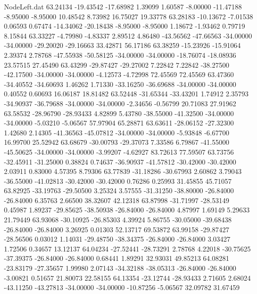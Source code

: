 \begin{filecontents}{NodeLeft.dat}
  63.24134  -19.43542  -17.68982     1.39099    1.60587   -8.00000  -11.47188   -8.95000   -8.95000   10.48542    8.73982   16.75027   19.33778
  63.28183  -10.13672   -7.01538     0.06593    0.67474  -14.34062  -20.18438   -8.95000   -8.95000    1.18672   -1.93462    0.79719    8.15844
  63.33227   -4.79980   -4.83337     2.89512    4.86480  -43.56562  -47.66563  -34.00000  -34.00000  -29.20020  -29.16663   33.42871   56.17186
  63.38259  -15.23926  -15.91064     2.39374    2.78768  -47.55938  -50.58125  -34.00000  -34.00000  -18.76074  -18.08936   23.57515   27.45490
  63.43299  -29.87427  -29.27002     7.22842    7.22842  -38.27500  -42.17500  -34.00000  -34.00000   -4.12573   -4.72998   72.45569   72.45569
  63.47360  -34.40552  -34.60693     1.46262    1.71330  -33.16250  -36.69688  -34.00000  -34.00000    0.40552    0.60693   16.06187   18.81482
  63.52448  -31.65344  -33.43201     1.74912    2.35793  -34.90937  -36.79688  -34.00000  -34.00000   -2.34656   -0.56799   20.71083   27.91962
  63.58532  -28.96790  -28.93433     4.82899    5.43780  -38.55000  -41.32500  -34.00000  -34.00000   -5.03210   -5.06567   57.97904   65.28871
  63.63611  -28.06152  -27.32300     1.42680    2.14305  -41.36563  -45.07812  -34.00000  -34.00000   -5.93848   -6.67700   16.99700   25.52942
  63.68679  -30.00793  -29.37073     7.33586    6.79867  -41.55000  -45.50625  -34.00000  -34.00000   -3.99207   -4.62927   83.72613   77.59507
  63.73756  -32.45911  -31.25000     0.38824    0.74637  -36.90937  -41.57812  -30.42000  -30.42000    2.03911    0.83000    4.57395    8.79306
  63.77839  -31.18286  -30.67993     2.60862    3.79043  -36.55000  -41.02813  -30.42000  -30.42000    0.76286    0.25993   31.45855   45.71057
  63.82925  -33.19763  -29.50500     3.25324    3.57555  -31.31250  -38.80000  -26.84000  -26.84000    6.35763    2.66500   38.32607   42.12318
  63.87998  -31.71997  -28.53149     0.45987    1.89237  -29.85625  -38.50938  -26.84000  -26.84000    4.87997    1.69149    5.29633   21.79449
  63.93068  -30.10925  -26.85303     4.39924    5.86755  -30.05000  -39.68438  -26.84000  -26.84000    3.26925    0.01303   52.13717   69.53872
  63.99158  -29.87427  -28.56506     0.03012    1.14031  -29.48750  -38.34375  -26.84000  -26.84000    3.03427    1.72506    0.34657   13.12137
  64.04234  -27.52441  -28.73291     2.78768    4.22018  -30.75625  -37.39375  -26.84000  -26.84000    0.68441    1.89291   32.93031   49.85213
  64.08281  -23.83179  -27.35657     1.99980    2.07143  -34.32188  -38.05313  -26.84000  -26.84000   -3.00821    0.51657   21.80073   22.58155
  64.13354  -23.12744  -28.93433     2.71605    2.68024  -43.11250  -43.27813  -34.00000  -34.00000  -10.87256   -5.06567   32.09782   31.67459

\end{filecontents}
